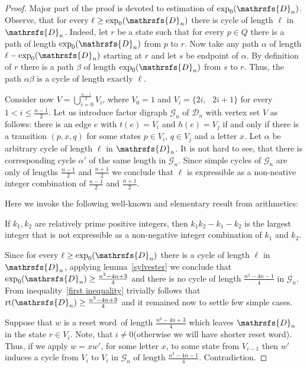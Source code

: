 \documentclass[11pt]{llncs}
\newcommand{\sw}{reset word}
\DeclareMathOperator{\rt}{rt}
\begin{document}
\begin{proof}

Major part of the proof is devoted to estimation of $\exp_0(\mathrsfs{D}_n)$.
Observe, that for every $\ell \geq \exp_0(\mathrsfs{D}_n)$ there
is cycle of length $\ell$ in $\mathrsfs{D}_n$. Indeed, let $r$ be a state such
that for every $p \in Q$ there is a path of length $\exp_0(\mathrsfs{D}_n)$ from
$p$ to $r$. Now take any path $\alpha$ of length $\ell - \exp_0(\mathrsfs{D}_n)$
starting at $r$ and let $s$ be endpoint of $\alpha$. By definition of $r$ there is a path
$\beta$ of length $\exp_0(\mathrsfs{D}_n)$ from $s$ to $r$. Thus, the path $\alpha\beta$
is a cycle of length exactly $\ell$.

Consider now $V =\bigcup\limits_{i = 0}^{\frac{n - 1}{2}} V_i$, where $V_0 = {1}$ and $V_i = \{2i,\text{ } 2i + 1\}$ for
every $1 < i \leq \frac{n - 1}{2}$. Let us introduce factor digraph $\mathcal{G}_n$ of
$\mathcal{D}_n$ with vertex set $V$ as follows: there is an edge $e$ with $t(e) = V_i$
and $h(e) = V_j$ if and only if there is a transition $(p,x,q)$ for some states $p \in V_i$,
$q \in V_j$ and a letter $x$.
Let $\alpha$ be arbitrary cycle of length $\ell$ in $\mathrsfs{D}_n$.
It is not hard to see, that there is corresponding
cycle $\alpha'$ of the same length in $\mathcal{G}_n$. Since simple cycles of $\mathcal{G}_n$
are only of lengths $\frac{n - 1}{2}$ and $\frac{n + 1}{2}$ we conclude that $\ell$ is
expressible as a non-neative integer combination of $\frac{n - 1}{2}$
and $\frac{n + 1}{2}$.

Here we invoke the following well-known and elementary result from arithmetics:
\begin{lemma}
\label{sylvester} If $k_1,k_2$ are relatively prime positive integers, then
$k_1k_2-k_1-k_2$ is the largest integer that is not expressible as a
non-negative integer combination of $k_1$ and $k_2$.
\end{lemma}
Since for every $\ell \geq \exp_0(\mathrsfs{D}_n)$ there is a cycle of
length $\ell$ in $\mathrsfs{D}_n$, applying lemma~\ref{sylvester} we conclude that
$\exp_0(\mathrsfs{D}_n) \geq \frac{n^2 -4n + 3}{4}$ and there is no cycle of length $\frac{n^2 -4n - 1}{4}$ in $\mathcal{G}_n$.
From inequality~\ref{first inequality} trivially follows that $\rt(\mathrsfs{D}_n) \geq \frac{n^2 -4n + 3}{4}$
and it remained now to settle few simple cases.

Suppose that $w$ is a \sw\ of length $\frac{n^2 -4n + 3}{4}$ which leaves $\mathrsfs{D}_n$
in the state $r \in V_i$. Note, that $i \neq 0$(otherwise we will have shorter \sw). Thus, if we apply
$w = xw'$, for some letter $x$, to some state from $V_{i - 1}$ then $w'$ induces a cycle from $V_i$ to $V_i$
in $\mathcal{G}_n$ of length $\frac{n^2 -4n - 1}{4}$. Contradiction.


\end{proof}
\end{document}
